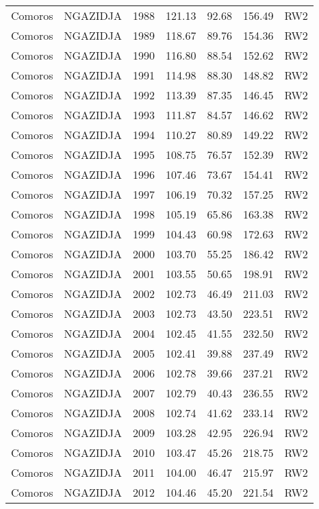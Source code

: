 \begin{longtable}{lllrrrl}
  Comoros & NGAZIDJA & 1988 & 121.13 & 92.68 & 156.49 & RW2 \\ 
  Comoros & NGAZIDJA & 1989 & 118.67 & 89.76 & 154.36 & RW2 \\ 
  Comoros & NGAZIDJA & 1990 & 116.80 & 88.54 & 152.62 & RW2 \\ 
  Comoros & NGAZIDJA & 1991 & 114.98 & 88.30 & 148.82 & RW2 \\ 
  Comoros & NGAZIDJA & 1992 & 113.39 & 87.35 & 146.45 & RW2 \\ 
  Comoros & NGAZIDJA & 1993 & 111.87 & 84.57 & 146.62 & RW2 \\ 
  Comoros & NGAZIDJA & 1994 & 110.27 & 80.89 & 149.22 & RW2 \\ 
  Comoros & NGAZIDJA & 1995 & 108.75 & 76.57 & 152.39 & RW2 \\ 
  Comoros & NGAZIDJA & 1996 & 107.46 & 73.67 & 154.41 & RW2 \\ 
  Comoros & NGAZIDJA & 1997 & 106.19 & 70.32 & 157.25 & RW2 \\ 
  Comoros & NGAZIDJA & 1998 & 105.19 & 65.86 & 163.38 & RW2 \\ 
  Comoros & NGAZIDJA & 1999 & 104.43 & 60.98 & 172.63 & RW2 \\ 
  Comoros & NGAZIDJA & 2000 & 103.70 & 55.25 & 186.42 & RW2 \\ 
  Comoros & NGAZIDJA & 2001 & 103.55 & 50.65 & 198.91 & RW2 \\ 
  Comoros & NGAZIDJA & 2002 & 102.73 & 46.49 & 211.03 & RW2 \\ 
  Comoros & NGAZIDJA & 2003 & 102.73 & 43.50 & 223.51 & RW2 \\ 
  Comoros & NGAZIDJA & 2004 & 102.45 & 41.55 & 232.50 & RW2 \\ 
  Comoros & NGAZIDJA & 2005 & 102.41 & 39.88 & 237.49 & RW2 \\ 
  Comoros & NGAZIDJA & 2006 & 102.78 & 39.66 & 237.21 & RW2 \\ 
  Comoros & NGAZIDJA & 2007 & 102.79 & 40.43 & 236.55 & RW2 \\ 
  Comoros & NGAZIDJA & 2008 & 102.74 & 41.62 & 233.14 & RW2 \\ 
  Comoros & NGAZIDJA & 2009 & 103.28 & 42.95 & 226.94 & RW2 \\ 
  Comoros & NGAZIDJA & 2010 & 103.47 & 45.26 & 218.75 & RW2 \\ 
  Comoros & NGAZIDJA & 2011 & 104.00 & 46.47 & 215.97 & RW2 \\ 
  Comoros & NGAZIDJA & 2012 & 104.46 & 45.20 & 221.54 & RW2 \\ 

\end{longtable}
